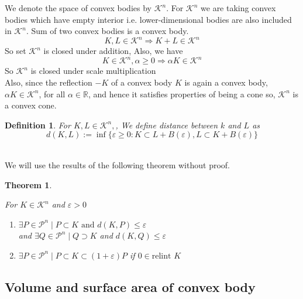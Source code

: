 \documentclass[oneside]{book}
\newtheorem{theorem}{Theorem}[section]
\newtheorem{mydef}{Definition}[section]
\begin{document}
	
	We denote the space of convex bodies by  $\mathcal{K}^{n}$. For  $\mathcal{K}^{n}$  we are taking convex bodies which have empty interior i.e. lower-dimensional bodies are also included in $\mathcal{K}^{n}$. 
	Sum of two convex bodies is a convex body. \\
	$$
	K, L \in \mathcal{K}^{n} \Longrightarrow K+L \in \mathcal{K}^{n}
	$$ 
	So  set $\mathcal{K}^{n}$ is closed under addition,
	Also, we have
	$$ 
	K \in \mathcal{K}^{n}, \alpha \geq 0 \Longrightarrow \alpha K \in \mathcal{K}^{n}
	$$
	So  $\mathcal{K}^{n}$ is closed under scale multiplication \\
	Also, since the reflection $-K$ of a convex body $K$ is again a convex body, $\alpha K \in \mathcal{K}^{n}$, for all $\alpha \in \mathbb{R}$, and hence it satisfies properties of being a cone so,  $\mathcal{K}^{n}$ is a convex cone.
	\begin{mydef}     \label{d:13}
		For  $ K, L \in \mathcal{K}^{n}, $, We define distance between $k$ and $L$ as 
		\begin{equation}
			\label{eq42}
			d(K, L):=\inf \{\varepsilon \geq 0: K \subset L+B(\varepsilon), L \subset K+B(\varepsilon)\}
		\end{equation}
	\end{mydef}
	\quad 
	\\
	We will use the results of the following theorem without proof. 
	
	\begin{theorem}
		\label{t:8}
		
		For  $K \in \mathcal{K}^{n}$ and $\varepsilon>0$ \\
		\begin{enumerate}
			\item
			\( \exists  P  \in \mathcal{P}^{n} \mid  P \subset K \text{ and }  d(K, P) \leq \varepsilon \) \\
			\hspace{10pt} and 
			\newline
			\( \exists Q \in \mathcal{P}^{n} \mid  Q \supset K \) and \( d(K, Q) \leq \varepsilon\)
			\item 
			\( \exists  P \in \mathcal{P}^{n} \mid P \subset K \subset(1+\varepsilon) P \) 
			if $0 \in \text{relint } K $ \label{4.1.5}
		\end{enumerate}
	\end{theorem}
	\subsection{Volume and surface area of convex body} \label{ss:19}
	
\end{document}
